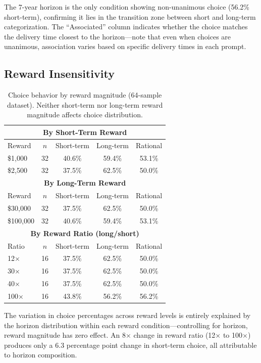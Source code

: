 \documentclass{article}
\begin{document}
The 7-year horizon is the only condition showing non-unanimous choice (56.2\% short-term), confirming it lies in the transition zone between short and long-term categorization. The ``Associated'' column indicates whether the choice matches the delivery time closest to the horizon---note that even when choices are unanimous, association varies based on specific delivery times in each prompt.

\subsection{Reward Insensitivity}

\begin{table}[h]
\caption{Choice behavior by reward magnitude (64-sample dataset). Neither short-term nor long-term reward magnitude affects choice distribution.}
\label{tab:reward_sensitivity}
\centering
\begin{tabular}{lcccc}
\toprule
\multicolumn{5}{c}{\textbf{By Short-Term Reward}} \\
\midrule
Reward & $n$ & Short-term & Long-term & Rational \\
\midrule
\$1,000 & 32 & 40.6\% & 59.4\% & 53.1\% \\
\$2,500 & 32 & 37.5\% & 62.5\% & 50.0\% \\
\midrule
\multicolumn{5}{c}{\textbf{By Long-Term Reward}} \\
\midrule
Reward & $n$ & Short-term & Long-term & Rational \\
\midrule
\$30,000 & 32 & 37.5\% & 62.5\% & 50.0\% \\
\$100,000 & 32 & 40.6\% & 59.4\% & 53.1\% \\
\midrule
\multicolumn{5}{c}{\textbf{By Reward Ratio (long/short)}} \\
\midrule
Ratio & $n$ & Short-term & Long-term & Rational \\
\midrule
12$\times$ & 16 & 37.5\% & 62.5\% & 50.0\% \\
30$\times$ & 16 & 37.5\% & 62.5\% & 50.0\% \\
40$\times$ & 16 & 37.5\% & 62.5\% & 50.0\% \\
100$\times$ & 16 & 43.8\% & 56.2\% & 56.2\% \\
\bottomrule
\end{tabular}
\end{table}

The variation in choice percentages across reward levels is entirely explained by the horizon distribution within each reward condition---controlling for horizon, reward magnitude has zero effect. An 8$\times$ change in reward ratio (12$\times$ to 100$\times$) produces only a 6.3 percentage point change in short-term choice, all attributable to horizon composition.
\end{document}
